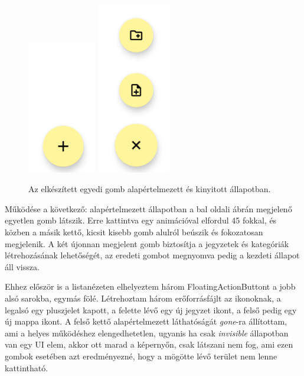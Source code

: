 \begin{figure}[!ht]
	\centering
	\includegraphics[width=30mm, keepaspectratio]{figures/floatingbutton_closed.png}
	\includegraphics[width=32mm, keepaspectratio]{figures/floatingbutton_open_small.png}
	\caption{Az elkészített egyedi gomb alapértelmezett és kinyitott állapotban.}
	\label{fig:FloatingActionButton}
\end{figure}

Működése a következő: alapértelmezett állapotban a bal oldali ábrán megjelenő egyetlen gomb látszik. Erre kattintva egy animációval elfordul 45 fokkal, és közben a másik kettő, kicsit kisebb gomb alulról beúszik és fokozatosan megjelenik. A két újonnan megjelent gomb biztosítja a jegyzetek és kategóriák létrehozásának lehetőségét, az eredeti gombot megnyomva pedig a kezdeti állapot áll vissza.

Ehhez először is a listanézeten elhelyeztem három FloatingActionButtont a jobb alsó sarokba, egymás fölé. Létrehoztam három erőforrásfájlt az ikonoknak, a legalsó egy pluszjelet kapott, a felette lévő egy új jegyzet ikont, a felső pedig egy új mappa ikont. A felső kettő alapértelmezett láthatóságát \emph{gone}-ra állítottam, ami a helyes működéshez elengedhetetlen, ugyanis ha csak \emph{invisible} állapotban van egy UI elem, akkor ott marad a képernyőn, csak látszani nem fog, ami ezen gombok esetében azt eredményezné, hogy a mögötte lévő terület nem lenne kattintható.


